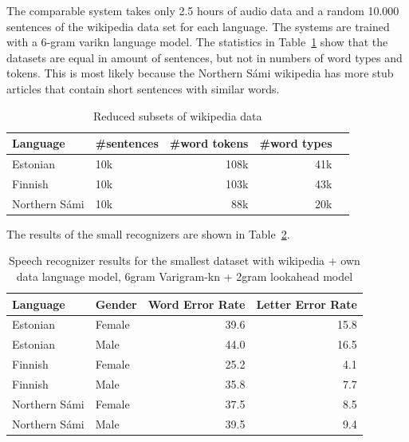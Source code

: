 \documentclass[b5paper]{article}
\newcommand{\ns}{{Northern Sámi }}
\begin{document}
The comparable system takes only 2.5 hours of audio data and a random 10.000 sentences of the wikipedia data set for each language. The systems are trained with a 6-gram varikn language model. The statistics in Table~\ref{tbl:lmdatacomp_small} show that the datasets are equal in amount of sentences, but not in numbers of word types and tokens. This is most likely because the \ns wikipedia has more stub articles that contain short sentences with similar words.


\begin{table}[!h]
\centering
\begin{tabular}{llrrr}
\textbf{Language} & \textbf{\#sentences} & \textbf{\#word tokens} & \textbf{\#word types}\\\hline
Estonian &   10k & 108k & 41k \\
 Finnish &   10k  & 103k & 43k \\
 \ns &  10k & 88k & 20k\\
\end{tabular}
\caption{Reduced subsets of wikipedia data\label{tbl:lmdatacomp_small}}
\end{table}

The results of the small recognizers are shown in Table~\ref{tbl:resultssmallcomp}.

\begin{table}[!h]
\centering
\begin{tabular}{llrr}
\textbf{Language} & \textbf{Gender} & \textbf{Word Error Rate} & \textbf{Letter Error Rate}\\\hline
Estonian & Female & 39.6 & 15.8 \\
Estonian & Male & 44.0 & 16.5\\
Finnish & Female & 25.2 &4.1 \\
Finnish & Male &  35.8 & 7.7 \\
\ns & Female & 37.5 & 8.5 \\
\ns & Male & 39.5 & 9.4 \\
\end{tabular}
\caption{Speech recognizer results for the smallest dataset with wikipedia + own data language model, 6gram Varigram-kn + 2gram lookahead model \label{tbl:resultssmallcomp}}
\end{table}
\end{document}
